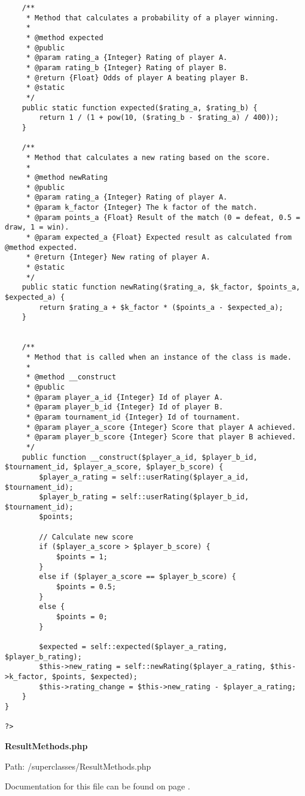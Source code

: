 {\begin{lstlisting}
	/**
	 * Method that calculates a probability of a player winning.
	 *
	 * @method expected
	 * @public
	 * @param rating_a {Integer} Rating of player A.
	 * @param rating_b {Integer} Rating of player B.
	 * @return {Float} Odds of player A beating player B.
	 * @static
	 */
	public static function expected($rating_a, $rating_b) {
		return 1 / (1 + pow(10, ($rating_b - $rating_a) / 400));
	}

	/**
	 * Method that calculates a new rating based on the score.
	 *
	 * @method newRating
	 * @public
	 * @param rating_a {Integer} Rating of player A.
	 * @param k_factor {Integer} The k factor of the match.
	 * @param points_a {Float} Result of the match (0 = defeat, 0.5 = draw, 1 = win).
	 * @param expected_a {Float} Expected result as calculated from @method expected.
	 * @return {Integer} New rating of player A.
	 * @static
	 */
	public static function newRating($rating_a, $k_factor, $points_a, $expected_a) {
		return $rating_a + $k_factor * ($points_a - $expected_a);
	}


	/**
	 * Method that is called when an instance of the class is made.
	 *
	 * @method __construct
	 * @public
	 * @param player_a_id {Integer} Id of player A.
	 * @param player_b_id {Integer} Id of player B.
	 * @param tournament_id {Integer} Id of tournament.
	 * @param player_a_score {Integer} Score that player A achieved.
	 * @param player_b_score {Integer} Score that player B achieved.
	 */
	public function __construct($player_a_id, $player_b_id, $tournament_id, $player_a_score, $player_b_score) {
		$player_a_rating = self::userRating($player_a_id, $tournament_id);
		$player_b_rating = self::userRating($player_b_id, $tournament_id);
		$points;

		// Calculate new score
		if ($player_a_score > $player_b_score) {
			$points = 1;
		}
		else if ($player_a_score == $player_b_score) {
			$points = 0.5;
		}
		else {
			$points = 0;
		}

		$expected = self::expected($player_a_rating, $player_b_rating);
		$this->new_rating = self::newRating($player_a_rating, $this->k_factor, $points, $expected);
		$this->rating_change = $this->new_rating - $player_a_rating;
	}
}

?>\end{lstlisting}
}
\textbf{ResultMethods.php}\label{ResultMethods.php}

Path: /superclasses/ResultMethods.php

Documentation for this file can be found on page \pageref{ResultMethods.php.doc}.

